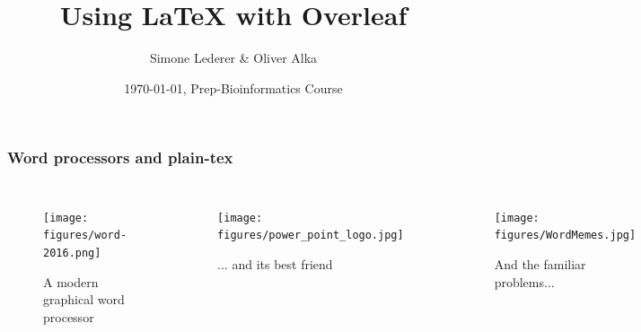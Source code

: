 \documentclass{beamer}
\title[Basic \LaTeX{}]{Using \LaTeX{} with Overleaf}
\author{Simone Lederer \& Oliver Alka}
\institute[]
{Algorithms in Bioinformatics, ZBIT\\
  University of T\"{u}bingen \\ 
}
\date[Vorkurs WiSe 2020/21]{\monthyeardate\today, Prep-Bioinformatics Course}
\begin{document}

\begin{frame} %
\frametitle{Word processors and plain-tex}
\begin{columns}
    \begin{figure}
        \caption{A modern graphical word processor}
        \texttt{[image: figures/word-2016.png]}
    \end{figure}
    \begin{figure}
        \caption{... and its best friend}
        \texttt{[image: figures/power\_point\_logo.jpg]}
    \end{figure}
    \begin{figure}
        \caption{And the familiar problems...}
        \texttt{[image: figures/WordMemes.jpg]}
    \end{figure}
\end{columns}
\end{frame}
\end{document}
